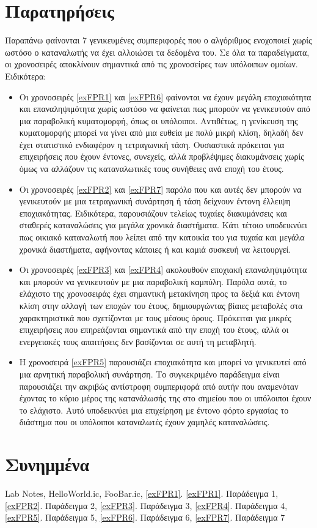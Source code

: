 \documentclass[a4paper, 11pt]{article}
\begin{document}
\section*{Παρατηρήσεις}
Παραπάνω φαίνονται 7 γενικευμένες συμπεριφορές που ο αλγόριθμος ενοχοποιεί χωρίς ωστόσο ο καταναλωτής να έχει αλλοιώσει τα δεδομένα του. Σε όλα τα παραδείγματα, οι χρονοσειρές αποκλίνουν σημαντικά από τις χρονοσείρες των υπόλοιπων ομοίων. Ειδικότερα:
\begin{itemize}
\item Οι χρονοσειρές \ref{exFPR1} και \ref{exFPR6} φαίνονται να έχουν μεγάλη εποχιακότητα και επαναληψιμότητα χωρίς ωστόσο να φαίνεται πως μπορούν να γενικευτούν από μια παραβολική κυματομορφή, όπως οι υπόλοιποι. Αντιθέτως, η γενίκευση της κυματομορφής μπορεί να γίνει από μια ευθεία με πολύ μικρή κλίση, δηλαδή δεν έχει στατιστικό ενδιαφέρον η τετραγωνική τάση. Ουσιαστικά πρόκειται για επιχειρήσεις που έχουν έντονες, συνεχείς, αλλά προβλέψιμες διακυμάνσεις χωρίς όμως να αλλάζουν τις καταναλωτικές τους συνήθειες ανά εποχή του έτους. 
\item Οι χρονοσειρές \ref{exFPR2} και \ref{exFPR7} παρόλο που και αυτές δεν μπορούν να γενικευτούν με μια τετραγωνική συνάρτηση ή τάση δείχνουν έντονη έλλειψη εποχιακότητας. Ειδικότερα, παρουσιάζουν τελείως τυχαίες διακυμάνσεις και σταθερές καταναλώσεις για μεγάλα χρονικά διαστήματα. Κάτι τέτοιο υποδεικνύει πως οικιακό καταναλωτή που λείπει από την κατοικία του για τυχαία και μεγάλα χρονικά διαστήματα, αφήνοντας κάποιες ή και καμιά συσκευή να λειτουργεί.
\item Οι χρονοσειρές \ref{exFPR3} και \ref{exFPR4} ακολουθούν εποχιακή επαναληψιμότητα και μπορούν να γενικευτούν με μια παραβολική καμπύλη. Παρόλα αυτά, το ελάχιστο της χρονοσειράς έχει σημαντική μετακίνηση προς τα δεξιά και έντονη κλίση στην αλλαγή των εποχών του έτους, δημιουργώντας βίαιες μεταβολές στα χαρακτηριστικά που σχετίζονται με τους μέσους όρους. Πρόκειται για μικρές επιχειρήσεις που επηρεάζονται σημαντικά από την εποχή του έτους, αλλά οι ενεργειακές τους απαιτήσεις δεν βασίζονται σε αυτή τη μεταβλητή.
\item Η χρονοσειρά \ref{exFPR5} παρουσιάζει εποχιακότητα και μπορεί να γενικευτεί από μια αρνητική παραβολική συνάρτηση. Το συγκεκριμένο παράδειγμα είναι παρουσιάζει την ακριβώς αντίστροφη συμπεριφορά από αυτήν που αναμενόταν έχοντας το κύριο μέρος της κατανάλωσής της στο σημείου που οι υπόλοιποι έχουν το ελάχιστο. Αυτό υποδεικνύει μια επιχείρηση με έντονο φόρτο εργασίας το διάστημα που οι υπόλοιποι καταναλωτές έχουν χαμηλές καταναλώσεις.
\end{itemize}



\section*{Συνημμένα}
\ifx
Lab Notes, HelloWorld.ic, FooBar.ic,
\ref{exFPR1}.
\fi %
\ref{exFPR1}. Παράδειγμα 1, \ref{exFPR2}. Παράδειγμα 2, \ref{exFPR3}. Παράδειγμα 3, \ref{exFPR4}. Παράδειγμα 4, \ref{exFPR5}. Παράδειγμα 5, \ref{exFPR6}. Παράδειγμα 6, \ref{exFPR7}. Παράδειγμα 7
\end{document}
